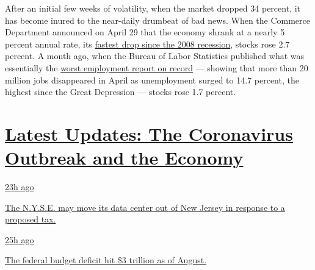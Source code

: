 After an initial few weeks of volatility, when the market dropped 34
percent, it has become inured to the near-daily drumbeat of bad news.
When the Commerce Department announced on April 29 that the economy
shrank at a nearly 5 percent annual rate, its
\href{https://www.nytimes3xbfgragh.onion/2020/04/29/business/economy/us-gdp.html}{fastest
drop since the 2008 recession}, stocks rose 2.7 percent. A month ago,
when the Bureau of Labor Statistics published what was essentially the
\href{https://www.nytimes3xbfgragh.onion/interactive/2020/05/08/business/economy/april-jobs-report.html}{worst
employment report on record} --- showing that more than 20 million jobs
disappeared in April as unemployment surged to 14.7 percent, the highest
since the Great Depression --- stocks rose 1.7 percent.

\hypertarget{latest-updates-the-coronavirus-outbreak-and-the-economy}{%
\section{\texorpdfstring{\href{https://www.nytimes3xbfgragh.onion/live/2020/09/11/business/stock-market-today-coronavirus?action=click\&pgtype=Article\&state=default\&region=MAIN_CONTENT_1\&context=storylines_live_updates}{Latest
Updates: The Coronavirus Outbreak and the
Economy}}{Latest Updates: The Coronavirus Outbreak and the Economy}}\label{latest-updates-the-coronavirus-outbreak-and-the-economy}}

\href{https://www.nytimes3xbfgragh.onion/live/2020/09/11/business/stock-market-today-coronavirus?action=click\&pgtype=Article\&state=default\&region=MAIN_CONTENT_1\&context=storylines_live_updates\#the-nyse-may-move-its-data-center-out-of-new-jersey-in-response-to-a-proposed-tax}{23h
ago}

\href{https://www.nytimes3xbfgragh.onion/live/2020/09/11/business/stock-market-today-coronavirus?action=click\&pgtype=Article\&state=default\&region=MAIN_CONTENT_1\&context=storylines_live_updates\#the-nyse-may-move-its-data-center-out-of-new-jersey-in-response-to-a-proposed-tax}{The
N.Y.S.E. may move its data center out of New Jersey in response to a
proposed tax.}

\href{https://www.nytimes3xbfgragh.onion/live/2020/09/11/business/stock-market-today-coronavirus?action=click\&pgtype=Article\&state=default\&region=MAIN_CONTENT_1\&context=storylines_live_updates\#the-federal-budget-deficit-hit-3-trillion-as-of-august}{25h
ago}

\href{https://www.nytimes3xbfgragh.onion/live/2020/09/11/business/stock-market-today-coronavirus?action=click\&pgtype=Article\&state=default\&region=MAIN_CONTENT_1\&context=storylines_live_updates\#the-federal-budget-deficit-hit-3-trillion-as-of-august}{The
federal budget deficit hit \$3 trillion as of August.}

